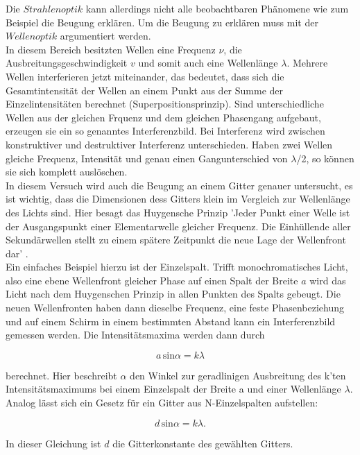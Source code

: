         \noindent Die $Strahlenoptik$ kann allerdings nicht alle beobachtbaren Phänomene wie zum Beispiel die Beugung erklären. Um die Beugung zu erklären muss mit der $Wellenoptik$ argumentiert werden.\\
        In diesem Bereich besitzten Wellen eine Frequenz $\nu$, die Ausbreitungsgeschwindigkeit $v$ und somit auch eine Wellenlänge $\lambda$.
        Mehrere Wellen interferieren jetzt miteinander, das bedeutet, dass sich die Gesamtintensität der Wellen an einem Punkt aus der Summe der 
        Einzelintensitäten berechnet (Superpositionsprinzip). Sind unterschiedliche Wellen aus der gleichen Frquenz und dem gleichen Phasengang 
        aufgebaut, erzeugen sie ein so genanntes Interferenzbild. Bei Interferenz wird zwischen konstruktiver und destruktiver Interferenz 
        unterschieden. Haben zwei Wellen gleiche Frequenz, Intensität und genau einen Gangunterschied von $\lambda$/2, so können sie sich 
        komplett auslöschen.\\
        In diesem Versuch wird auch die Beugung an einem Gitter genauer untersucht, es ist wichtig, dass die Dimensionen dess Gitters klein im 
        Vergleich zur Wellenlänge des Lichts sind. Hier besagt das Huygensche Prinzip 'Jeder Punkt einer Welle ist der Ausgangspunkt einer 
        Elementarwelle gleicher Frequenz. Die Einhüllende aller Sekundärwellen stellt zu einem spätere Zeitpunkt die neue Lage der Wellenfront
        dar' \cite{400}.\\
        Ein einfaches Beispiel hierzu ist der Einzelspalt. Trifft monochromatisches Licht, also eine ebene Wellenfront gleicher Phase auf einen Spalt der Breite $a$ wird das Licht nach dem Huygenschen Prinzip in allen Punkten des Spalts gebeugt. Die neuen Wellenfronten 
        haben dann dieselbe Frequenz, eine feste Phasenbeziehung und auf einem Schirm in einem bestimmten Abstand kann ein Interferenzbild gemessen werden. 
        Die Intensitätsmaxima werden dann durch 

        \begin{equation}
            a \, \text{sin} \alpha = k \lambda
        \end{equation}

        \noindent
        berechnet. Hier beschreibt $\alpha$ den Winkel zur geradlinigen Ausbreitung des k'ten Intensitätsmaximums bei einem Einzelspalt der Breite a 
        und einer Wellenlänge $\lambda$.\\
        Analog lässt sich ein Gesetz für ein Gitter aus N-Einzelspalten aufstellen:

        \begin{equation}
            d \, \text{sin} \alpha = k \lambda.
        \end{equation}

        \noindent In dieser Gleichung ist $d$ die Gitterkonstante des gewählten Gitters.
